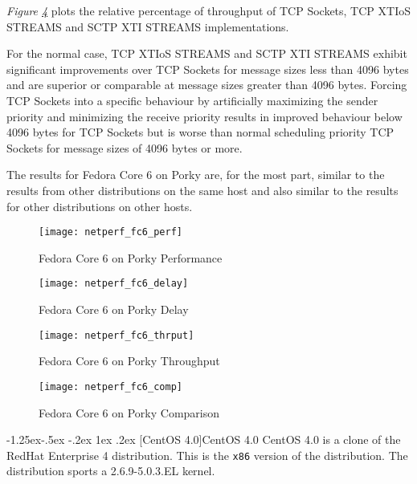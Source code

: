 \documentclass[letterpaper,final,notitlepage,twocolumn,10pt,twoside]{article}
\makeatletter
\renewcommand\subsubsection{\@startsection{subsubsection}{3}{\z@}%
                                     {-1.25ex\@plus -.5ex \@minus -.2ex}%
                                     {1ex \@plus .2ex}%
                                     {\normalfont\normalsize\bfseries}}
\makeatother
\begin{document}
\begin{description}
\textit{Figure \ref{figure:fc6comp}}
plots the relative percentage of throughput of TCP Sockets, TCP XTIoS STREAMS and SCTP XTI STREAMS
implementations.

For the normal case, TCP XTIoS STREAMS and SCTP XTI STREAMS exhibit significant improvements over
TCP Sockets for message sizes less than 4096 bytes and are superior or comparable  at message sizes
greater than 4096 bytes.  Forcing TCP Sockets into a specific behaviour by artificially maximizing
the sender priority and minimizing the receive priority results in improved behaviour below 4096
bytes for TCP Sockets but is worse than normal scheduling priority TCP Sockets for message sizes of
4096 bytes or more.

\end{description}

The results for Fedora Core 6 on Porky are, for the most part, similar to the results from other
distributions on the same host and also similar to the results for other distributions on other
hosts.

\begin{figure}[p]
\center\texttt{[image: netperf\_fc6\_perf]}
\caption[Fedora Core 6 on Porky Performance]{Fedora Core 6 on Porky Performance}
\label{figure:fc6perf}
\end{figure}

\begin{figure}[p]
\center\texttt{[image: netperf\_fc6\_delay]}
\caption[Fedora Core 6 on Porky Delay]{Fedora Core 6 on Porky Delay}
\label{figure:fc6dly}
\end{figure}

\begin{figure}[p]
\center\texttt{[image: netperf\_fc6\_thrput]}
\caption[Fedora Core 6 on Porky Throughput]{Fedora Core 6 on Porky Throughput}
\label{figure:fc6thrput}
\end{figure}

\begin{figure}[pt]
\center\texttt{[image: netperf\_fc6\_comp]}
\caption[Fedora Core 6 on Porky Comparison]{Fedora Core 6 on Porky Comparison}
\label{figure:fc6comp}
\end{figure}

\subsubsection[CentOS 4.0]{CentOS 4.0}
CentOS 4.0 is a clone of the RedHat Enterprise 4 distribution.  This is the
\texttt{x86} version of the distribution.  The distribution sports a
2.6.9-5.0.3.EL kernel.
\end{document}
